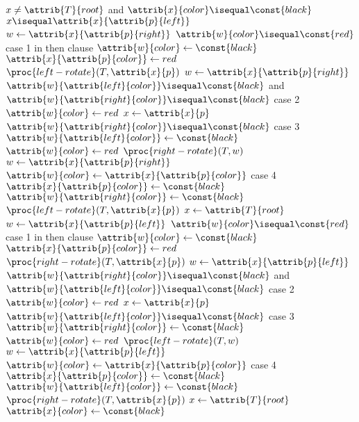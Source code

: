 \documentclass{article}
\begin{document}
\begin{codebox}
\li \While $x \neq \attrib{T}{root}$ and $\attrib{x}{color} \isequal \const{black}$
\li \Do
        \If $x \isequal \attrib{x}{\attrib{p}{left}}$
\li     \Then
            $w \gets{\attrib{x}{\attrib{p}{right}}}$
\li         \If $\attrib{w}{color} \isequal \const{red}$ \Comment case 1 in then clause
\li         \Then
                $\attrib{w}{color} \gets{\const{black}}$
\li             $\attrib{x}{\attrib{p}{color}} \gets{red }$
\li             $\proc{left-rotate}(T, \attrib{x}{p})$
\li             $w \gets{\attrib{x}{\attrib{p}{right}}}$
            \End
\li         \If $\attrib{w}{\attrib{left}{color}} \isequal \const{black}$ and $\attrib{w}{\attrib{right}{color}} \isequal \const{black}$ \Comment case 2
\li         \Then
                $\attrib{w}{color} \gets{red}$
\li             $x \gets{\attrib{x}{p}}$
\li         \Else
\li             \If $\attrib{w}{\attrib{right}{color}} \isequal \const{black}$ \Comment case 3
\li             \Then
                    $\attrib{w}{\attrib{left}{color}} \gets{\const{black}}$
\li                 $\attrib{w}{color} \gets{red}$
\li                 $\proc{right-rotate}(T, w)$
\li                 $w \gets{\attrib{x}{\attrib{p}{right}}}$
                \End
\li             $\attrib{w}{color} \gets{\attrib{x}{\attrib{p}{color}}}$ \Comment case 4
\li             $\attrib{x}{\attrib{p}{color}} \gets{\const{black}}$
\li             $\attrib{w}{\attrib{right}{color}} \gets{\const{black}}$
\li             $\proc{left-rotate}(T, \attrib{x}{p})$
\li             $x \gets{\attrib{T}{root}}$
            \End
\li     \Else
\li         $w \gets{\attrib{x}{\attrib{p}{left}}}$
\li         \If $\attrib{w}{color} \isequal \const{red}$ \Comment case 1 in then clause
\li         \Then
                $\attrib{w}{color} \gets{\const{black}}$
\li             $\attrib{x}{\attrib{p}{color}} \gets{red }$
\li             $\proc{right-rotate}(T, \attrib{x}{p})$
\li             $w \gets{\attrib{x}{\attrib{p}{left}}}$
            \End
\li         \If $\attrib{w}{\attrib{right}{color}} \isequal \const{black}$ and $\attrib{w}{\attrib{left}{color}} \isequal \const{black}$ \Comment case 2
\li         \Then
                $\attrib{w}{color} \gets{red}$
\li             $x \gets{\attrib{x}{p}}$
\li         \Else
\li             \If $\attrib{w}{\attrib{left}{color}} \isequal \const{black}$ \Comment case 3
\li             \Then
                    $\attrib{w}{\attrib{right}{color}} \gets{\const{black}}$
\li                 $\attrib{w}{color} \gets{red}$
\li                 $\proc{left-rotate}(T, w)$
\li                 $w \gets{\attrib{x}{\attrib{p}{left}}}$
                \End
\li             $\attrib{w}{color} \gets{\attrib{x}{\attrib{p}{color}}}$ \Comment case 4
\li             $\attrib{x}{\attrib{p}{color}} \gets{\const{black}}$
\li             $\attrib{w}{\attrib{left}{color}} \gets{\const{black}}$
\li             $\proc{right-rotate}(T, \attrib{x}{p})$
\li             $x \gets{\attrib{T}{root}}$
            \End
        \End
    \End
\li $\attrib{x}{color} \gets{\const{black}}$
\end{codebox}
\end{document}
